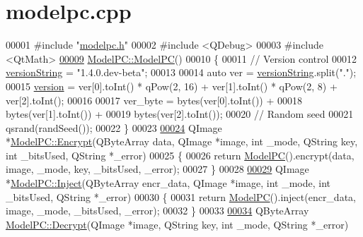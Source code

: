 \hypertarget{modelpc_8cpp_source}{}\section{modelpc.\+cpp}
\label{modelpc_8cpp_source}

\begin{DoxyCode}
00001 \textcolor{preprocessor}{#include "\hyperlink{modelpc_8h}{modelpc.h}"}
00002 \textcolor{preprocessor}{#include <QDebug>}
00003 \textcolor{preprocessor}{#include <QtMath>}
\hypertarget{modelpc_8cpp_source.tex_l00009}{}\hyperlink{class_model_p_c_ae12ebe65ec973c02a0de4850a7c1e31c}{00009} \hyperlink{class_model_p_c_ae12ebe65ec973c02a0de4850a7c1e31c}{ModelPC::ModelPC}()
00010 \{
00011     \textcolor{comment}{// Version control}
00012     \hyperlink{class_model_p_c_a5f426725ccf7eefd3c77ea8c720264c9}{versionString} = \textcolor{stringliteral}{"1.4.0.dev-beta"};
00013 
00014     \textcolor{keyword}{auto} ver = \hyperlink{class_model_p_c_a5f426725ccf7eefd3c77ea8c720264c9}{versionString}.split(\textcolor{stringliteral}{"."});
00015     \hyperlink{class_model_p_c_a5af48ab89e19be42a94c34ba00249401}{version} = ver[0].toInt() * qPow(2, 16) + ver[1].toInt() * qPow(2, 8) + ver[2].toInt();
00016 
00017     ver\_byte = bytes(ver[0].toInt()) +
00018             bytes(ver[1].toInt()) +
00019             bytes(ver[2].toInt());
00020     \textcolor{comment}{// Random seed}
00021     qsrand(randSeed());
00022 \}
00023 
\hypertarget{modelpc_8cpp_source.tex_l00024}{}\hyperlink{class_model_p_c_a271cf9285e32df58ffbfc918e6482bbd}{00024} QImage *\hyperlink{class_model_p_c_a271cf9285e32df58ffbfc918e6482bbd}{ModelPC::Encrypt}(QByteArray data, QImage *image, \textcolor{keywordtype}{int} \_mode, QString key, \textcolor{keywordtype}{int} 
      \_bitsUsed, QString *\_error)
00025 \{
00026     \textcolor{keywordflow}{return} \hyperlink{class_model_p_c_ae12ebe65ec973c02a0de4850a7c1e31c}{ModelPC}().encrypt(data, image, \_mode, key, \_bitsUsed, \_error);
00027 \}
00028 
\hypertarget{modelpc_8cpp_source.tex_l00029}{}\hyperlink{class_model_p_c_ac17e68e6aab134621b0d151d74acdc82}{00029} QImage *\hyperlink{class_model_p_c_ac17e68e6aab134621b0d151d74acdc82}{ModelPC::Inject}(QByteArray encr\_data, QImage *image, \textcolor{keywordtype}{int} \_mode, \textcolor{keywordtype}{int} \_bitsUsed, 
      QString *\_error)
00030 \{
00031     \textcolor{keywordflow}{return} \hyperlink{class_model_p_c_ae12ebe65ec973c02a0de4850a7c1e31c}{ModelPC}().inject(encr\_data, image, \_mode, \_bitsUsed, \_error);
00032 \}
00033 
\hypertarget{modelpc_8cpp_source.tex_l00034}{}\hyperlink{class_model_p_c_a902abaea4f07995b48c0f2fea6eceb7c}{00034} QByteArray \hyperlink{class_model_p_c_a902abaea4f07995b48c0f2fea6eceb7c}{ModelPC::Decrypt}(QImage *image, QString key, \textcolor{keywordtype}{int} \_mode, QString *\_error)

\end{DoxyCode}
